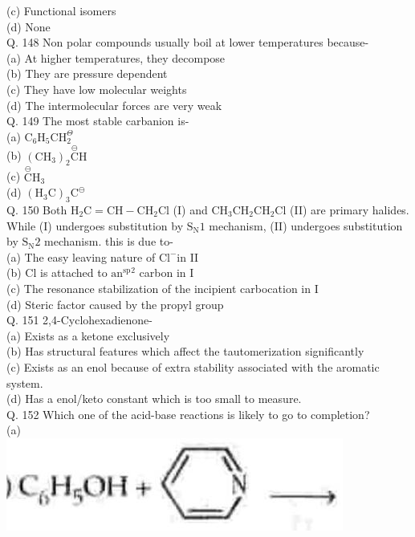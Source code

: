 \documentclass[10pt]{article}
\begin{document}
(c) Functional isomers\\
(d) None\\
Q. 148 Non polar compounds usually boil at lower temperatures because-\\
(a) At higher temperatures, they decompose\\
(b) They are pressure dependent\\
(c) They have low molecular weights\\
(d) The intermolecular forces are very weak\\
Q. 149 The most stable carbanion is-\\
(a) $\mathrm{C}_{6} \mathrm{H}_{5} \mathrm{CH}_{2}^{\Theta}$\\
(b) $\left(\mathrm{CH}_{3}\right)_{2} \stackrel{\ominus}{\mathrm{C}} \mathrm{H}$\\
(c) $\stackrel{\ominus}{\mathrm{C}} \mathrm{H}_{3}$\\
(d) $\left(\mathrm{H}_{3} \mathrm{C}\right)_{3} \mathrm{C}^{\ominus}$\\
Q. 150 Both $\mathrm{H}_{2} \mathrm{C}=\mathrm{CH}-\mathrm{CH}_{2} \mathrm{Cl}$ (I) and $\mathrm{CH}_{3} \mathrm{CH}_{2} \mathrm{CH}_{2} \mathrm{Cl}$ (II) are primary halides. While (I) undergoes substitution by $\mathrm{S}_{\mathrm{N}} 1$ mechanism, (II) undergoes substitution by $\mathrm{S}_{\mathrm{N}} 2$ mechanism. this is due to-\\
(a) The easy leaving nature of $\mathrm{Cl}^{-}$in II\\
(b) Cl is attached to $\mathrm{an}^{\mathrm{sp}}{ }^{2}$ carbon in I\\
(c) The resonance stabilization of the incipient carbocation in I\\
(d) Steric factor caused by the propyl group\\
Q. 151 2,4-Cyclohexadienone-\\
(a) Exists as a ketone exclusively\\
(b) Has structural features which affect the tautomerization significantly\\
(c) Exists as an enol because of extra stability associated with the aromatic system.\\
(d) Has a enol/keto constant which is too small to measure.\\
Q. 152 Which one of the acid-base reactions is likely to go to completion?\\
(a)\\
\includegraphics[max width=\textwidth, center]{2025_01_28_8470952b98110cec3aabg-144}\\
\end{document}
